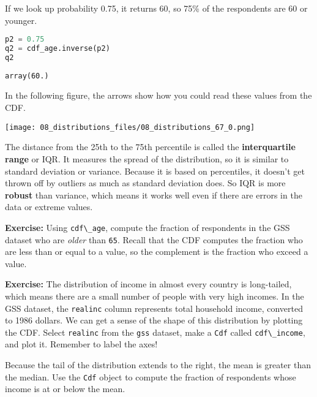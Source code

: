 \pagebreak

If we look up probability 0.75, it returns 60, so 75\% of the
respondents are 60 or younger.

\begin{lstlisting}[language=Python,style=source]
p2 = 0.75
q2 = cdf_age.inverse(p2)
q2
\end{lstlisting}

\begin{lstlisting}[style=output]
array(60.)
\end{lstlisting}

In the following figure, the arrows show how you could read these values
from the CDF.



\begin{center}
\texttt{[image: 08\_distributions\_files/08\_distributions\_67\_0.png]}
\end{center}

The distance from the 25th to the 75th percentile is called the
\textbf{interquartile range} or IQR. It measures the spread of the
distribution, so it is similar to standard deviation or variance.
Because it is based on percentiles, it doesn't get thrown off by
outliers as much as standard deviation does. So IQR is more
\textbf{robust} than variance, which means it works well even if there
are errors in the data or extreme values.


\textbf{Exercise:} Using \passthrough{\lstinline!cdf\_age!}, compute the
fraction of respondents in the GSS dataset who are \emph{older} than
\passthrough{\lstinline!65!}. Recall that the CDF computes the fraction
who are less than or equal to a value, so the complement is the fraction
who exceed a value.

\textbf{Exercise:} The distribution of income in almost every country is
long-tailed, which means there are a small number of people with very
high incomes. In the GSS dataset, the \passthrough{\lstinline!realinc!}
column represents total household income, converted to 1986 dollars. We
can get a sense of the shape of this distribution by plotting the CDF.
Select \passthrough{\lstinline!realinc!} from the
\passthrough{\lstinline!gss!} dataset, make a
\passthrough{\lstinline!Cdf!} called
\passthrough{\lstinline!cdf\_income!}, and plot it. Remember to label
the axes!

Because the tail of the distribution extends to the right, the mean is
greater than the median. Use the \passthrough{\lstinline!Cdf!} object to
compute the fraction of respondents whose income is at or below the
mean.

